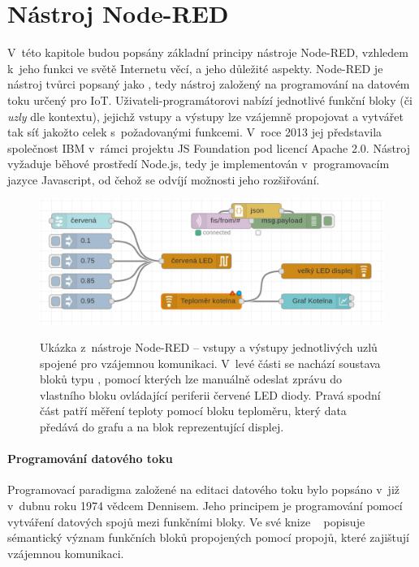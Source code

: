 \chapter{Nástroj Node-RED}
\label{ch:nastroj-node-red}

V~této kapitole budou popsány základní principy nástroje Node-RED, vzhledem k~jeho funkci ve světě Internetu věcí, a
jeho důležité aspekty.
Node-RED je nástroj tvůrci popsaný jako , tedy nástroj založený na
programování na datovém toku určený pro IoT. Uživateli-programátorovi nabízí jednotlivé funkční bloky (či \emph{uzly}
dle kontextu),
jejichž vstupy a výstupy lze vzájemně propojovat a vytvářet tak síť jakožto celek s~požadovanými funkcemi.
V~roce 2013 jej představila společnost IBM v~rámci projektu JS Foundation pod licencí Apache 2.0. Nástroj vyžaduje
běhové prostředí Node.js, tedy je implementován v~programovacím jazyce Javascript, od čehož se odvíjí možnosti
jeho rozšiřování.

\begin{figure}
    \includegraphics[width=\textwidth]{figures/node-red-example.png}
    \label{fig:node-red-example}
    \caption{Ukázka z~nástroje Node-RED -- vstupy a výstupy jednotlivých uzlů spojené pro vzájemnou komunikaci.
    V~levé části se nachází soustava bloků typu , pomocí kterých lze manuálně odeslat zprávu do vlastního
    bloku ovládající periferii červené LED diody.
    Pravá spodní část patří měření teploty pomocí bloku teploměru, který data předává do grafu a na blok
    reprezentující displej.}
\end{figure}

\subsubsection{Programování datového toku}
Programovací paradigma založené na editaci datového toku bylo popsáno v~již v~dubnu roku 1974 vědcem Dennisem. Jeho
principem je programování pomocí vytváření datových spojů mezi funkčními bloky.
Ve své knize ~\cite{FirstVersionOfDataflow} popisuje sémantický
význam funkčních bloků propojených pomocí propojů, které zajištují vzájemnou komunikaci.

